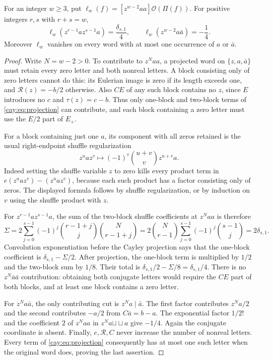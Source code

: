 \begin{lemma}\label{cay:lem:coordinate}
For an integer $w\ge3$, put
$\ell_w(f)=[z^{w-2}aa]\mathcal O(\Pi(f))$.
For positive integers $r,s$ with $r+s=w$,
\begin{equation}\label{cay:eq:coordinate-family}
 \ell_w(z^{r-1}az^{s-1}a)=\frac{\delta_{s,1}}4,
 \qquad
 \ell_w(z^{w-2}a\bar a)=-\frac14.
\end{equation}
Moreover $\ell_w$ vanishes on every word with at most one occurrence
of $a$ or $\bar a$.
\end{lemma}
\begin{proof}
Write $N=w-2>0$.  To contribute to $z^Naa$, a projected word on
$\{z,a,\bar a\}$ must retain every zero letter and both nonreal
letters.  A block consisting only of zero letters cannot do this:
its Eulerian image is zero if its length exceeds one, and
$\mathcal R(z)=-b/2$ otherwise.  Also $CE$ of any such block contains
no $z$, since $E$ introduces no $c$ and $\tau(z)=c-b$.
Thus only one-block and two-block terms of
\eqref{cay:eq:projection} can contribute, and each block containing
a zero letter must use the $E/2$ part of $E_+$.

For a block containing just one $a$, its component with all zeros
retained is the usual right-endpoint shuffle regularization
\[
 z^uaz^v\longmapsto
 (-1)^v\binom{u+v}{v}z^{u+v}a.
\]
Indeed setting the shuffle variable $z$ to zero kills every product
term in $e(z^uaz^v)-(z^uaz^v)$, because each such product has a
factor consisting only of zeros.  The displayed formula follows by
shuffle regularization, or by induction on $v$ using the shuffle
product with $z$.

For $z^{r-1}az^{s-1}a$, the sum of the two-block shuffle coefficients
at $z^Naa$ is therefore
\[
 \Sigma=2\sum_{j=0}^{s-1}(-1)^j
   \binom{r-1+j}{j}\binom{N}{r-1+j}
 =2\binom{N}{r-1}\sum_{j=0}^{s-1}(-1)^j\binom{s-1}{j}
 =2\delta_{s,1}.
\]
Convolution exponentiation before the Cayley projection says that
the one-block coefficient is $\delta_{s,1}-\Sigma/2$.
After projection, the one-block term is multiplied by $1/2$ and
the two-block sum by $1/8$.  Their total is
$\delta_{s,1}/2-\Sigma/8=\delta_{s,1}/4$.
There is no $z^N\bar a\bar a$ contribution: obtaining both
conjugate letters would require the $CE$ part of both blocks, and
at least one block contains a zero letter.

For $z^Na\bar a$, the only contributing cut is $z^Na\mid\bar a$.
The first factor contributes $z^Na/2$ and the second contributes
$-a/2$ from $C\bar a=b-a$.  The exponential factor $1/2!$ and
the coefficient $2$ of $z^Naa$ in $z^Na\mathbin{\sqcup\!\sqcup}a$
give $-1/4$.  Again the conjugate coordinate is absent.  Finally,
$e,\mathcal R,C$ never increase the number of nonreal letters.
Every term of \eqref{cay:eq:projection} consequently has at most
one such letter when the original word does, proving the last assertion.
\end{proof}


